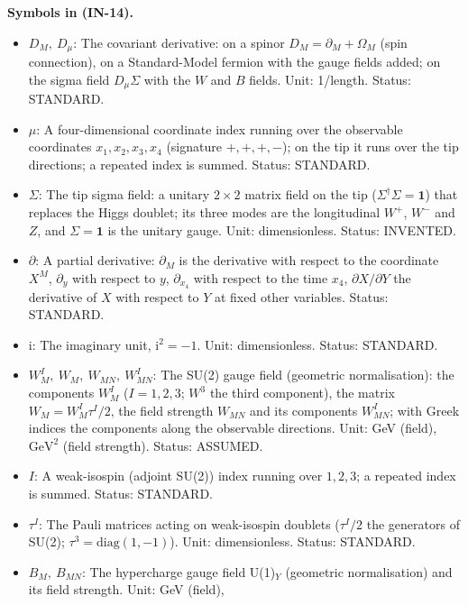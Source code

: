 \documentclass[
  10pt,
]{article}
\providecommand{\tightlist}{%
  \setlength{\itemsep}{0pt}\setlength{\parskip}{0pt}}
\begin{document}
\textbf{Symbols in (IN-14).}

\begin{itemize}
\tightlist
\item
  \(D_M,\ D_\mu\): The covariant derivative: on a spinor
  \(D_M = \partial_M + \Omega_M\) (spin connection), on a Standard-Model
  fermion with the gauge fields added; on the sigma field
  \(D_\mu\Sigma\) with the \(W\) and \(B\) fields. Unit: 1/length.
  Status: STANDARD.
\item
  \(\mu\): A four-dimensional coordinate index running over the
  observable coordinates \(x_1, x_2, x_3, x_4\) (signature \(+,+,+,-\));
  on the tip it runs over the tip directions; a repeated index is
  summed. Status: STANDARD.
\item
  \(\Sigma\): The tip sigma field: a unitary \(2 \times 2\) matrix field
  on the tip (\(\Sigma^\dagger\Sigma = \mathbf{1}\)) that replaces the
  Higgs doublet; its three modes are the longitudinal \(W^+\), \(W^-\)
  and \(Z\), and \(\Sigma = \mathbf{1}\) is the unitary gauge. Unit:
  dimensionless. Status: INVENTED.
\item
  \(\partial\): A partial derivative: \(\partial_M\) is the derivative
  with respect to the coordinate \(X^M\), \(\partial_y\) with respect to
  \(y\), \(\partial_{x_4}\) with respect to the time \(x_4\),
  \(\partial X/\partial Y\) the derivative of \(X\) with respect to
  \(Y\) at fixed other variables. Status: STANDARD.
\item
  \(\mathrm{i}\): The imaginary unit, \(\mathrm{i}^2 = -1\). Unit:
  dimensionless. Status: STANDARD.
\item
  \(W^I_M,\ W_M,\ W_{MN},\ W^I_{MN}\): The SU(2) gauge field (geometric
  normalisation): the components \(W^I_M\) (\(I = 1, 2, 3\); \(W^3\) the
  third component), the matrix \(W_M = W^I_M\tau^I/2\), the field
  strength \(W_{MN}\) and its components \(W^I_{MN}\); with Greek
  indices the components along the observable directions. Unit: GeV
  (field), \(\mathrm{GeV}^{2}\) (field strength). Status: ASSUMED.
\item
  \(I\): A weak-isospin (adjoint SU(2)) index running over \(1, 2, 3\);
  a repeated index is summed. Status: STANDARD.
\item
  \(\tau^I\): The Pauli matrices acting on weak-isospin doublets
  (\(\tau^I/2\) the generators of SU(2);
  \(\tau^3 = \mathrm{diag}(1, -1)\)). Unit: dimensionless. Status:
  STANDARD.
\item
  \(B_M,\ B_{MN}\): The hypercharge gauge field U(1)\(_Y\) (geometric
  normalisation) and its field strength. Unit: GeV (field),

\end{itemize}
\end{document}
